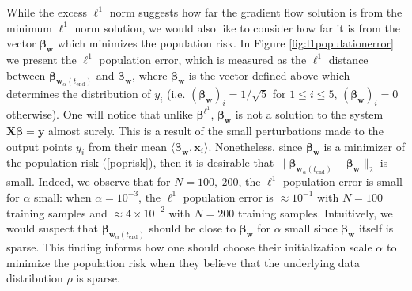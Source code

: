 \documentclass{article}
\begin{document}
While the excess $\ell^1$ norm suggests how far the gradient flow solution is from the minimum $\ell^1$ norm solution, we would also like to consider how far it is from the vector $\boldsymbol{\beta}_{\boldsymbol{w}}$ which minimizes the population risk. In Figure \ref{fig:l1populationerror} we present the $\ell^1$ population error, which is measured as the $\ell^1$ distance between $\boldsymbol{\beta}_{\boldsymbol{w}_{\alpha}(t_{\text{end}})}$ and $\boldsymbol{\beta}_{\boldsymbol{w}}$, where $\boldsymbol{\beta}_{\boldsymbol{w}}$ is the vector defined above which determines the distribution of $y_i$ (i.e. $(\boldsymbol{\beta}_{\boldsymbol{w}})_i = 1/\sqrt{5}$ for $1 \leq i \leq 5$, $(\boldsymbol{\beta}_{\boldsymbol{w}})_i = 0$ otherwise). One will notice that unlike $\boldsymbol{\beta}^{\ell^1}$, $\boldsymbol{\beta}_{\boldsymbol{w}}$ is not a solution to the system $\boldsymbol{X} \boldsymbol{\beta} = \boldsymbol{y}$ almost surely. This is a result of the small perturbations made to the output points $y_i$ from their mean $\langle \boldsymbol{\beta}_{\boldsymbol{w}}, \boldsymbol{x}_i \rangle$. Nonetheless, since $\boldsymbol{\beta}_{\boldsymbol{w}}$ is a minimizer of the population risk (\ref{poprisk}), then it is desirable that $\| \boldsymbol{\beta}_{\boldsymbol{w}_{\alpha}(t_{\text{end}})} - \boldsymbol{\beta}_{\boldsymbol{w}} \|_2$ is small. Indeed, we observe that for $N = 100, \ 200$, the $\ell^1$ population error is small for $\alpha$ small: when $\alpha = 10^{-3}$, the $\ell^1$ population error is $\approx 10^{-1}$ with $N=100$ training samples and $\approx 4 \times 10^{-2}$ with $N=200$ training samples. Intuitively, we would suspect that $\boldsymbol{\beta}_{\boldsymbol{w}_{\alpha}(t_{\text{end}})}$ should be close to $\boldsymbol{\beta}_{\boldsymbol{w}}$ for $\alpha$ small since $\boldsymbol{\beta}_{\boldsymbol{w}}$ itself is sparse. This finding informs how one should choose their initialization scale $\alpha$ to minimize the population risk when they believe that the underlying data distribution $\rho$ is sparse.
\end{document}
